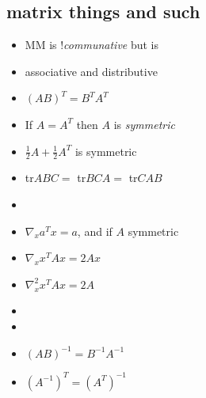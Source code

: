 \documentclass[11pt, oneside]{article}
\begin{document}
\noindent \begin{minipage}{0.38\linewidth} 
\subsection{matrix things and such}
\begin{itemize}
\item MM is !\emph{communative} but is 
\item[] associative and distributive 
\item $(AB)^T = B^TA^T$
\item If $A = A^T$ then $A$ is  \emph{symmetric}
\item[] $\frac{1}{2}A + \frac{1}{2}A^T$ is symmetric
\item tr$ABC =$ tr$BCA=$ tr$CAB$ 
\item[] 
\item $\nabla_x a^Tx = a$, and if $A$ symmetric 
\item[] $\nabla_x x^TAx = 2Ax$ 
\item[] $\nabla_x^2 x^TAx = 2A$
\item[] 
\item[]
\item $(AB)^{-1} = B^{-1}A^{-1}$  
\item $(A^{-1})^T = (A^T)^{-1}$ 
\end{itemize}
 \vspace{-.8em}
\end{minipage}
\end{document}
